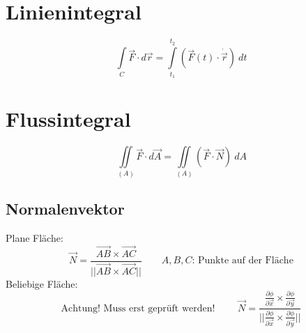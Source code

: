 \section{Linienintegral}
\[ \boxed{\int\limits_{C} \vec{F} \cdot d\vec{r} 
= \int\limits_{t_1}^{t_2} \left(\vec{F}(t) \cdot \dot{\vec{r}}\right) ~ dt} \]

\section{Flussintegral}
\[ \boxed{\iint\limits_{(A)} \vec{F} \cdot d\vec{A} 
= \iint\limits_{(A)} (\vec{F} \cdot \vec{N}) ~ dA} \]

\subsection{Normalenvektor}
Plane Fläche: 
\[ \boxed{\vec{N} 
= \frac{\overrightarrow{AB} \times \overrightarrow{AC}}
{||\overrightarrow{AB} \times \overrightarrow{AC}||}} 
\qquad \text{$A, B, C$: Punkte auf der Fläche} \]
Beliebige Fläche: 
\[ \text{Achtung! Muss erst geprüft werden! } \qquad \boxed{\vec{N} 
= \frac{\frac{\partial \phi}{\partial \vec{x}} 
\times \frac{\partial \phi}{\partial \vec{y}}}
{||\frac{\partial \phi}{\partial \vec{x}} 
\times \frac{\partial \phi}{\partial \vec{y}}||}} \]